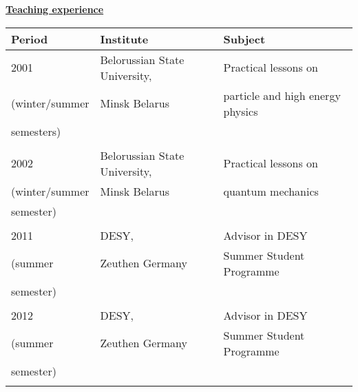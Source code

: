 {{\begin{tabular}{lll}
\end{tabular}

\newpage

\begin{center}{\bf{{\underline{Teaching experience}}}}\end{center} 

\vspace{1mm}

\begin{tabular}{lll}
Period               & Institute                      &    Subject                         \\
\hline               
2001                 & Belorussian State University,  & Practical lessons on               \\
(winter/summer       & Minsk Belarus                  & particle and high energy physics   \\
 semesters)          &                                &                                    \\
                     &                                &                                    \\
2002                 & Belorussian State University,  & Practical lessons on               \\
(winter/summer       & Minsk Belarus                  & quantum mechanics                  \\
semester)	     &				      &  	                           \\
                     &                                &                                    \\
2011                 & DESY,                          & Advisor in   DESY                \\
(summer              &  Zeuthen Germany               & Summer Student Programme          \\
semester)	     &				      &  	                           \\
                     &                                &                                    \\
2012                 & DESY,                          & Advisor in   DESY                \\
(summer              &  Zeuthen Germany               & Summer Student Programme          \\
semester)	     &				      &  	                           \\
                     &                                &                                    \\

\end{tabular}}}
